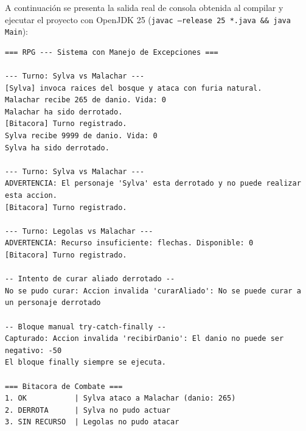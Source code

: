 \documentclass[11pt,letterpaper]{article}
\begin{document}
A continuación se presenta la salida real de consola obtenida al compilar y ejecutar el proyecto con OpenJDK 25 (\texttt{javac --release 25 *.java \&\& java Main}):

\begin{lstlisting}[style=TerminalStyle]
=== RPG --- Sistema con Manejo de Excepciones ===

--- Turno: Sylva vs Malachar ---
[Sylva] invoca raices del bosque y ataca con furia natural.
Malachar recibe 265 de danio. Vida: 0
Malachar ha sido derrotado.
[Bitacora] Turno registrado.
Sylva recibe 9999 de danio. Vida: 0
Sylva ha sido derrotado.

--- Turno: Sylva vs Malachar ---
ADVERTENCIA: El personaje 'Sylva' esta derrotado y no puede realizar esta accion.
[Bitacora] Turno registrado.

--- Turno: Legolas vs Malachar ---
ADVERTENCIA: Recurso insuficiente: flechas. Disponible: 0
[Bitacora] Turno registrado.

-- Intento de curar aliado derrotado --
No se pudo curar: Accion invalida 'curarAliado': No se puede curar a un personaje derrotado

-- Bloque manual try-catch-finally --
Capturado: Accion invalida 'recibirDanio': El danio no puede ser negativo: -50
El bloque finally siempre se ejecuta.

=== Bitacora de Combate ===
1. OK           | Sylva ataco a Malachar (danio: 265)
2. DERROTA      | Sylva no pudo actuar
3. SIN RECURSO  | Legolas no pudo atacar
\end{lstlisting}
\end{document}
